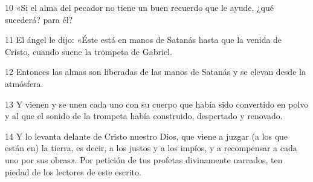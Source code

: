 \par 10 «Si el alma del pecador no tiene un buen recuerdo que le ayude, ¿qué sucederá? para él?

\par 11 El ángel le dijo: «Éste está en manos de Satanás hasta que la venida de Cristo, cuando suene la trompeta de Gabriel.

\par 12 Entonces las almas son liberadas de las manos de Satanás y se elevan desde la atmósfera.

\par 13 Y vienen y se unen cada uno con su cuerpo que había sido convertido en polvo y al que el sonido de la trompeta había construido, despertado y renovado.

\par 14 Y lo levanta delante de Cristo nuestro Dios, que viene a juzgar (a los que están en) la tierra, es decir, a los justos y a los impíos, y a recompensar a cada uno por sus obras». Por petición de tus profetas divinamente narrados, ten piedad de los lectores de este escrito.

